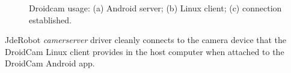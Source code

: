 \begin{figure}
\begin{subfigure}{0.33\textwidth}
		\caption{}
	\end{subfigure}
	\caption{Droidcam usage: (a) Android server; (b) Linux client; (c) connection established.}
	\label{fig:droidcam}
\end{figure}

JdeRobot \textit{camerserver} driver cleanly connects to the camera device that the DroidCam Linux client provides in the host computer when attached to the DroidCam Android app.
